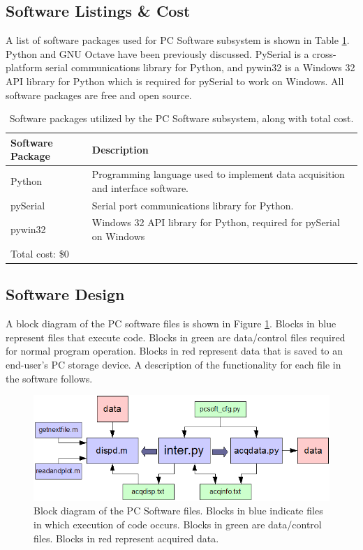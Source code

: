 \subsection[Software Listings \& Cost]{Software Listings \& Cost}

A list of software packages used for PC Software subsystem is shown in Table \ref{tab:software packages}. 
Python and GNU Octave have been previously discussed. PySerial is a cross-platform serial 
communications library for Python, and pywin32 is a Windows 32 API library for Python which is 
required for pySerial to work on Windows. All software packages are free and open source.


\begin{table}[h]
\begin{tabular}{l | p{8cm}}
	Software Package & Description \\ \hline
	Python & Programming language used to implement data acquisition and interface software. \\ 
	\hline
	pySerial & Serial port communications library for Python. \\
	\hline
	pywin32 & Windows 32 API library for Python, required for pySerial on Windows \\
	\hline
	\multicolumn{2}{l}{Total cost: \$0} \\
\end{tabular}
\caption[Software packages]{Software packages utilized by the PC Software subsystem, along with total cost.}
\label{tab:software packages}
\end{table}


\subsection[Software Design]{Software Design}
A block diagram of the PC software files is shown in Figure \ref{fig:pcsoft files diagram}. Blocks 
in blue represent files that execute code. Blocks in green are data/control files required for normal 
program operation. Blocks in red represent data that is saved to an end-user's PC storage device.
 A description of the functionality for each file in the software follows.


\begin{figure}[bhp]
\begin{center}
\includegraphics[scale=0.65]{../drawings/pcsoft_files_diagram.png}
\end{center}
\caption[PC Software Files Block Diagram]{Block diagram of the PC Software files. Blocks in blue
indicate files in which execution of code occurs. Blocks in green are data/control files. Blocks
in red represent acquired data.}
\label{fig:pcsoft files diagram}
\end{figure}


